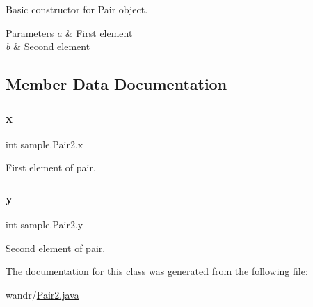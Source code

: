 Basic constructor for Pair object. 
\begin{DoxyParams}{Parameters}
{\em a} & First element \\
\hline
{\em b} & Second element \\
\hline
\end{DoxyParams}


\subsection{Member Data Documentation}
\mbox{\label{classsample_1_1_pair2_a179377ecccdae7e33bc0c222d41a9351}} 
\subsubsection{\texorpdfstring{x}{x}}
{\footnotesize\ttfamily int sample.\+Pair2.\+x}

First element of pair. \mbox{\label{classsample_1_1_pair2_a6958b07d5cba3855fe3cf7051bbfbb60}} 
\subsubsection{\texorpdfstring{y}{y}}
{\footnotesize\ttfamily int sample.\+Pair2.\+y}

Second element of pair. 

The documentation for this class was generated from the following file\+:\begin{DoxyCompactItemize}
\item 
wandr/\hyperlink{_pair2_8java}{Pair2.\+java}\end{DoxyCompactItemize}
